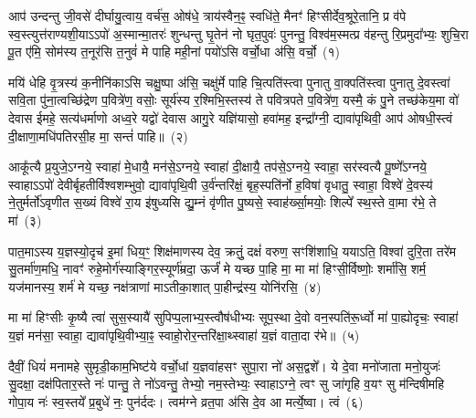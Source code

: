 \setcounter{anuvakam}{0}
आप॑ उन्दन्तु जी॒वसे॑ दीर्घायु॒त्वाय॒ वर्च॑स॒ ओष॑धे॒ त्राय॑स्वैन॒ꣴ॒ स्वधि॑ते॒ मैनꣳ॑ हिꣳसीर्देव॒श्रूरे॒तानि॒ प्र व॑पे स्व॒स्त्युत्त॑राण्यशी॒या\-ऽऽ\-पो॑ अ॒स्मान्मा॒तरः॑ शुन्धन्तु घृ॒तेन॑ नो घृत॒पुवः॑ पुनन्तु॒ विश्व॑म॒स्मत्प्र व॑हन्तु रि॒प्रमुदा᳚भ्यः॒ शुचि॒रा पू॒त ए॑मि॒ सोम॑स्य त॒नूर॑सि त॒नुवं॑ मे पाहि मही॒नां पयो॑\-ऽसि वर्चो॒धा अ॑सि॒ वर्चो॒~(१)\ip

मयि॑ धेहि वृ॒त्रस्य॑ क॒नीनि॑का\-ऽसि चक्षु॒ष्पा अ॑सि॒ चक्षु॑र्मे पाहि चि॒त्पति॑स्त्वा पुनातु वा॒क्पति॑स्त्वा पुनातु दे॒वस्त्वा॑ सवि॒ता पु॑ना॒त्वच्छि॑द्रेण प॒वित्रे॑ण॒ वसोः॒ सूर्य॑स्य र॒श्मिभि॒स्तस्य॑ ते पवित्रपते प॒वित्रे॑ण॒ यस्मै॒ कं पु॒ने तच्छ॑केय॒मा वो॑ देवास ईमहे॒ सत्य॑धर्माणो अध्व॒रे यद्वो॑ देवास आगु॒रे यज्ञि॑यासो॒ हवा॑मह॒ इन्द्रा᳚ग्नी॒ द्यावा॑पृथिवी॒ आप॑ ओषधी॒स्त्वं दी॒क्षाणा॒मधि॑\-पतिरसी॒ह मा॒ सन्तं॑ पाहि॥~(२)\ip

{\anuvakamend[{वर्च॑ ओषधीर॒ष्टौ च॑}]}

आकू᳚त्यै प्र॒युजे॒\-ऽग्नये॒ स्वाहा॑ मे॒धायै॒ मन॑से॒\-ऽग्नये॒ स्वाहा॑ दी॒क्षायै॒ तप॑से॒\-ऽग्नये॒ स्वाहा॒ सर॑स्वत्यै पू॒ष्णे᳚\-ऽग्नये॒ स्वाहा\-ऽऽ\-पो॑ देवीर्बृहतीर्विश्वशम्भुवो॒ द्यावा॑\-पृथि॒वी उ॒र्व॑न्तरि॑क्षं॒ बृह॒स्पति॑र्नो ह॒विषा॑ वृधातु॒ स्वाहा॒ विश्वे॑ दे॒वस्य॑ ने॒तुर्मर्तो॑\-ऽवृणीत स॒ख्यं विश्वे॑ रा॒य इ॑षुध्यसि द्यु॒म्नं वृ॑णीत पु॒ष्यसे॒ स्वाह॑र्ख्सा॒मयोः॒ शिल्पे᳚ स्थ॒स्ते वा॒मा र॑भे॒ ते मा॑~(३)\ip

पात॒मा\-ऽस्य य॒ज्ञस्यो॒दृच॑ इ॒मां धिय॒ꣳ॒ शिक्ष॑माणस्य देव॒ क्रतुं॒ दक्षं॑ वरुण॒ सꣳशि॑शाधि॒ यया\-ऽति॒ विश्वा॑ दुरि॒ता तरे॑म सु॒तर्मा॑ण॒मधि॒ नावꣳ॑ रुहे॒मोर्ग॑स्याङ्गिर॒स्यूर्ण॑म्रदा॒ ऊर्जं॑ मे यच्छ पा॒हि मा॒ मा मा॑ हिꣳसी॒र्विष्णोः॒ शर्मा॑सि॒ शर्म॒ यज॑मानस्य॒ शर्म॑ मे यच्छ॒ नक्ष॑त्राणां मा\-ऽतीका॒शात् पा॒हीन्द्र॑स्य॒ योनि॑रसि॒~(४)\ip

मा मा॑ हिꣳसीः कृ॒ष्यै त्वा॑ सुस॒स्यायै॑ सुपिप्प॒लाभ्य॒स्त्वौष॑\-धीभ्यः सूप॒स्था दे॒वो वन॒स्पति॑रू॒र्ध्वो मा॑ पा॒ह्योदृचः॒ स्वाहा॑ य॒ज्ञं मन॑सा॒ स्वाहा॒ द्यावा॑\-पृथि॒वीभ्या॒ꣴ॒ स्वाहो॒रोर॒न्तरि॑क्षा॒थ्\-स्वाहा॑ य॒ज्ञं वाता॒दा र॑भे॥~(५)\ip

{\anuvakamend[{मा॒ योनि॑रसि त्रि॒ꣳ॒शच्च॑}]}

दैवीं॒ धियं॑ मनामहे सुमृडी॒काम॒भिष्ट॑ये वर्चो॒धां य॒ज्ञवा॑हसꣳ सुपा॒रा नो॑ अस॒द्वशे᳚। ये दे॒वा मनो॑जाता मनो॒युजः॑ सु॒दक्षा॒ दक्ष॑पितार॒स्ते नः॑ पान्तु॒ ते नो॑\-ऽवन्तु॒ तेभ्यो॒ नम॒स्तेभ्यः॒ स्वाहा\-ऽग्ने॒ त्वꣳ सु जा॑गृहि व॒यꣳ सु म॑न्दिषीमहि गोपा॒य नः॑ स्व॒स्तये᳚ प्र॒बुधे॑ नः॒ पुन॑र्ददः। त्वम॑ग्ने व्रत॒पा अ॑सि दे॒व आ मर्त्ये॒ष्वा। त्वं~(६)\ip

